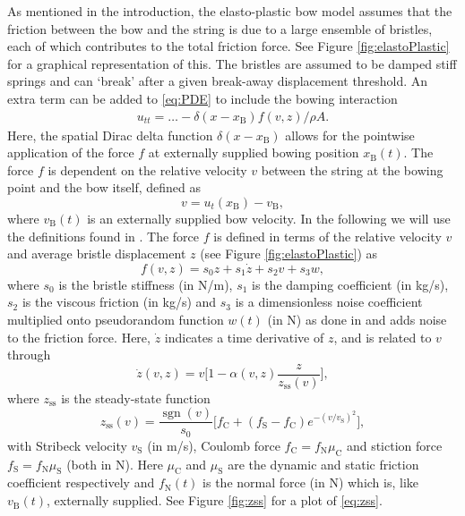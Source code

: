 \documentclass[twoside,a4paper,dvipsnames]{article}
\DeclareMathOperator{\sgn}{sgn}
\begin{document}
As mentioned in the introduction, the elasto-plastic bow model assumes that the friction between the bow and the string is due to a large ensemble of bristles, each of which contributes to the total friction force. See Figure \ref{fig:elastoPlastic} for a graphical representation of this. The bristles are assumed to be damped stiff springs and can `break' after a given break-away displacement threshold. An extra term can be added to \eqref{eq:PDE} to include the bowing interaction
\begin{equation}
    \begin{aligned}
    \label{eq:bowingTerm}
        u_{tt} = \hdots - \delta(x-x_\text{B})f(v, z)/\rho A.
    \end{aligned}
\end{equation}
Here, the spatial Dirac delta function $\delta(x-x_\text{B})$ allows for the pointwise application of the force $f$ at externally supplied bowing position $x_\text{B}(t)$. The force $f$ is dependent on the relative velocity $v$ between the string at the bowing point and the bow itself, defined as
\begin{equation}\label{eq:relVel}
  v = u_t(x_\text{B}) - v_\text{B},
\end{equation}
where $v_\text{B}(t)$ is an externally supplied bow velocity. In the following we will use the definitions found in \cite{Dupont2002}. The force $f$ is defined in terms of the relative velocity $v$ and average bristle displacement $z$ (see Figure \ref{fig:elastoPlastic}) as
\begin{equation}\label{eq:forceFunction}
    f(v, z) = s_0z + s_1\dot z + s_2v + s_3w,
\end{equation}
where $s_0$ is the bristle stiffness (in N/m), $s_1$ is the damping coefficient (in kg/s), $s_2$ is the viscous friction (in kg/s) and $s_3$ is a dimensionless noise coefficient multiplied onto pseudorandom function $w(t)$ (in N) as done in \cite{Serafin2004} and adds noise to the friction force. Here, $\dot{z}$ indicates a time derivative of $z$, and is related to $v$ through
\begin{equation}\label{eq:zdot}
    \dot z(v, z) = v \bigg[ 1-  \alpha(v, z)\frac{z}{z_\text{ss}(v)}\bigg],
\end{equation}
where $z_\text{ss}$ is the steady-state function
\begin{equation}\label{eq:zss}
    z_\text{ss}(v) = \frac{\sgn(v)}{s_0}\Big[f_\text{C}+(f_\text{S}-f_\text{C})e^{-(v/v_\text{S})^2}\Big],
\end{equation}
with Stribeck velocity $v_\text{S}$ (in m/s), Coulomb force $f_\text{C} = f_\text{N}\mu_\text{C}$ and stiction force $f_\text{S} = f_\text{N}\mu_\text{S}$ (both in N). Here $\mu_\text{C}$ and $\mu_\text{S}$ are the dynamic and static friction coefficient respectively and $f_\text{N}(t)$ is the normal force (in N) which is, like $v_\text{B}(t)$, externally supplied. See Figure \ref{fig:zss} for a plot of \eqref{eq:zss}. 
\end{document}
